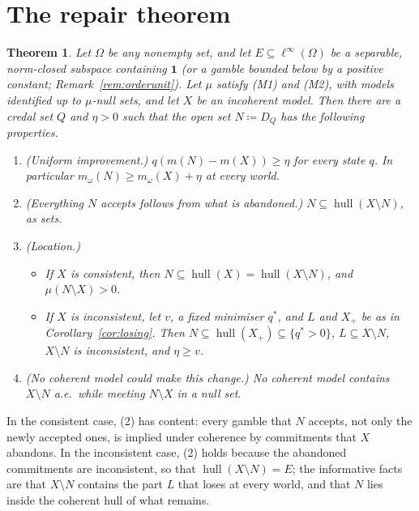\documentclass[11pt]{article}
\newcommand{\one}{\mathbf{1}}
\newcommand{\hull}{\operatorname{hull}}
\theoremstyle{plain}
\newtheorem{theorem}{Theorem}[section]
\theoremstyle{definition}
\theoremstyle{remark}
\begin{document}
\section{The repair theorem}\label{sec:repair}

\begin{theorem}\label{thm:repair}
Let $\Omega$ be any nonempty set, and let $E\subseteq\ell^\infty(\Omega)$ be a separable,
norm-closed subspace containing $\one$ (or a gamble bounded below by a positive constant;
Remark~\ref{rem:orderunit}). Let $\mu$ satisfy (M1) and (M2), with models identified up to
$\mu$-null sets, and let $X$ be an incoherent model. Then there are a credal set $Q$ and
$\eta>0$ such that the open set $N\coloneqq D_Q$ has the following properties.
\begin{enumerate}[label=(\arabic*)]
  \item (Uniform improvement.) $q(m(N)-m(X))\ge\eta$ for every state $q$. In particular
  $m_\omega(N)\ge m_\omega(X)+\eta$ at every world.
  \item (Everything $N$ accepts follows from what is abandoned.) $N\subseteq\hull(X
  \setminus N)$, as sets.
  \item (Location.)
  \begin{itemize}
    \item If $X$ is consistent, then $N\subseteq\hull(X)=\hull(X\setminus N)$, and
    $\mu(N\setminus X)>0$.
    \item If $X$ is inconsistent, let $v$, a fixed minimiser $q^\ast$, and $L$ and $X_+$ be as
    in Corollary~\ref{cor:losing}. Then $N\subseteq\hull(X_+)\subseteq\{q^\ast>0\}$, $L\subseteq
    X\setminus N$, $X\setminus N$ is inconsistent, and $\eta\ge v$.
  \end{itemize}
  \item (No coherent model could make this change.) No coherent model contains $X\setminus
  N$ a.e.\ while meeting $N\setminus X$ in a null set.
\end{enumerate}
\end{theorem}

In the consistent case, (2) has content: every gamble that $N$ accepts, not only the newly
accepted ones, is implied under coherence by commitments that $X$ abandons. In the
inconsistent case, (2) holds because the abandoned commitments are inconsistent, so that
$\hull(X\setminus N)=E$; the informative facts are that $X\setminus N$ contains the part $L$
that loses at every world, and that $N$ lies inside the coherent hull of what remains.
\end{document}
